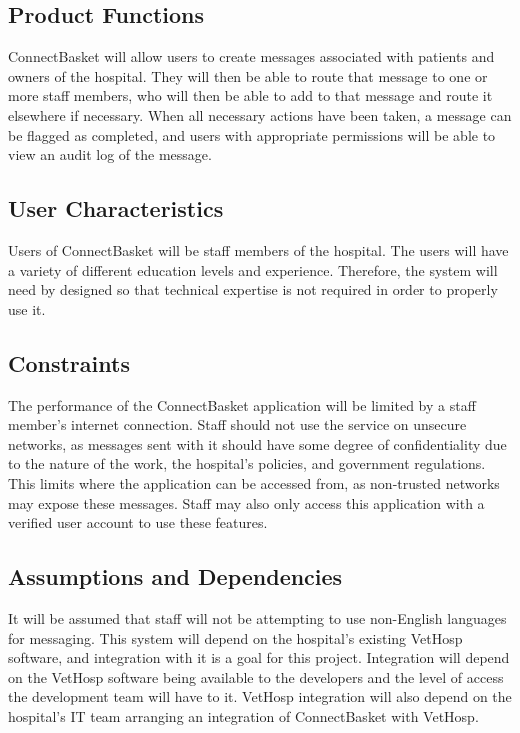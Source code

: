 \documentclass[onecolumn, draftclsnofoot,10pt, compsoc]{IEEEtran}
\begin{document}
\subsection{Product Functions}
ConnectBasket will allow users to create messages associated with patients and owners of the hospital. They will then be able to route that message to one or more staff members, who will then be able to add to that message and route it elsewhere if necessary. When all necessary actions have been taken, a message can be flagged as completed, and users with appropriate permissions will be able to view an audit log of the message.

\subsection{User Characteristics}
Users of ConnectBasket will be staff members of the hospital. The users will have a variety of different education levels and experience. Therefore, the system will need by designed so that technical expertise is not required in order to properly use it.

\subsection{Constraints}
The performance of the ConnectBasket application will be limited by a staff member's internet connection. Staff should not use the service on unsecure networks, as messages sent with it should have some degree of confidentiality due to the nature of the work, the hospital's policies, and government regulations. This limits where the application can be accessed from, as non-trusted networks may expose these messages. Staff may also only access this application with a verified user account to use these features.

\subsection{Assumptions and Dependencies}
It will be assumed that staff will not be attempting to use non-English languages for messaging. This system will depend on the hospital's existing VetHosp software, and integration with it is a goal for this project. Integration will depend on the VetHosp software being available to the developers and the level of access the development team will have to it. VetHosp integration will also depend on the hospital's IT team arranging an integration of ConnectBasket with VetHosp.
\end{document}
